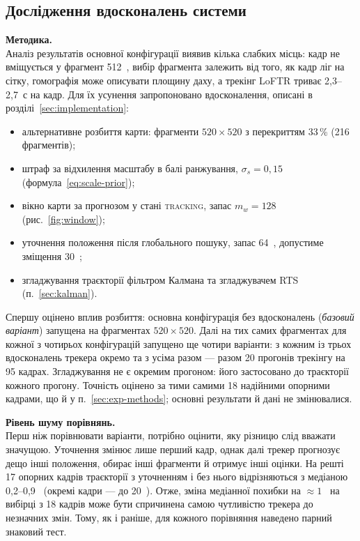 \documentclass[a4paper, 12pt, titlepage]{article}
\begin{document}
\subsection{Дослідження вдосконалень системи}
\label{sec:exp-improve}

\textbf{Методика.}\\
Аналіз результатів основної конфігурації виявив кілька слабких місць: кадр не вміщується у фрагмент 512~\px{}, вибір фрагмента залежить від того, як кадр ліг на сітку, гомографія може описувати площину даху, а трекінг LoFTR триває 2,3--2,7~с на кадр. Для їх усунення запропоновано вдосконалення, описані в розділі~\ref{sec:implementation}:
\begin{itemize}
    \item альтернативне розбиття карти: фрагменти $520 \times 520$ з перекриттям 33\,\% (216 фрагментів);
    \item штраф за відхилення масштабу в балі ранжування, $\sigma_s = 0{,}15$ (формула~\ref{eq:scale-prior});
    \item вікно карти за прогнозом у стані \textsc{tracking}, запас $m_w = 128$~\px{} (рис.~\ref{fig:window});
    \item уточнення положення після глобального пошуку, запас 64~\px{}, допустиме зміщення 30~\px{};
    \item згладжування траєкторії фільтром Калмана та згладжувачем RTS (п.~\ref{sec:kalman}).
\end{itemize}
Спершу оцінено вплив розбиття: основна конфігурація без вдосконалень (\emph{базовий варіант}) запущена на фрагментах $520 \times 520$. Далі на тих самих фрагментах для кожної з чотирьох конфігурацій запущено ще чотири варіанти: з кожним із трьох вдосконалень трекера окремо та з усіма разом --- разом 20 прогонів трекінгу на 95 кадрах. Згладжування не є окремим прогоном: його застосовано до траєкторії кожного прогону. Точність оцінено за тими самими 18 надійними опорними кадрами, що й у п.~\ref{sec:exp-methods}; основні результати й дані не змінювалися.

\textbf{Рівень шуму порівнянь.}\\
Перш ніж порівнювати варіанти, потрібно оцінити, яку різницю слід вважати значущою. Уточнення змінює лише перший кадр, однак далі трекер прогнозує дещо інші положення, обирає інші фрагменти й отримує інші оцінки. На решті 17 опорних кадрів траєкторії з уточненням і без нього відрізняються з медіаною 0,2--0,9~\px{} (окремі кадри --- до 20~\px{}). Отже, зміна медіанної похибки на $\approx 1$~\px{} на вибірці з 18 кадрів може бути спричинена самою чутливістю трекера до незначних змін. Тому, як і раніше, для кожного порівняння наведено парний знаковий тест.
\end{document}
